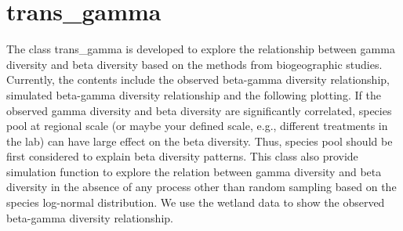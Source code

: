 \documentclass[
]{book}
\newenvironment{Shaded}{\begin{snugshade}}{\end{snugshade}}
\newcommand{\AttributeTok}[1]{\textcolor[rgb]{0.77,0.63,0.00}{#1}}
\newcommand{\CommentTok}[1]{\textcolor[rgb]{0.56,0.35,0.01}{\textit{#1}}}
\newcommand{\DecValTok}[1]{\textcolor[rgb]{0.00,0.00,0.81}{#1}}
\newcommand{\FloatTok}[1]{\textcolor[rgb]{0.00,0.00,0.81}{#1}}
\newcommand{\FunctionTok}[1]{\textcolor[rgb]{0.00,0.00,0.00}{#1}}
\newcommand{\NormalTok}[1]{#1}
\newcommand{\OtherTok}[1]{\textcolor[rgb]{0.56,0.35,0.01}{#1}}
\newcommand{\SpecialCharTok}[1]{\textcolor[rgb]{0.00,0.00,0.00}{#1}}
\newcommand{\StringTok}[1]{\textcolor[rgb]{0.31,0.60,0.02}{#1}}
\begin{document}
\begin{Shaded}
\end{Shaded}

\hypertarget{trans_gamma}{%
\section{trans\_gamma}\label{trans_gamma}}

The class trans\_gamma is developed to explore the relationship between gamma diversity and beta diversity
based on the methods from biogeographic studies\citep{Zhang_Local_2020}.
Currently, the contents include the observed beta-gamma diversity relationship, simulated beta-gamma diversity relationship and the following plotting.
If the observed gamma diversity and beta diversity are significantly correlated,
species pool at regional scale (or maybe your defined scale, e.g., different treatments in the lab) can have large effect on the beta diversity.
Thus, species pool should be first considered to explain beta diversity patterns.
This class also provide simulation function to explore the relation between gamma diversity and beta diversity in the absence of any process
other than random sampling based on the species log-normal distribution.
We use the wetland data to show the observed beta-gamma diversity relationship.
\end{document}
